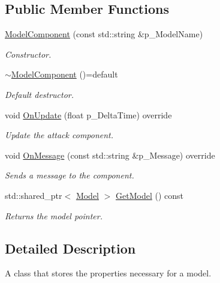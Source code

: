 \subsection*{Public Member Functions}
\begin{DoxyCompactItemize}
\item 
\mbox{\hyperlink{class_model_component_a2697cdcdf32b12a0c0bd69bbec809eb1}{Model\+Component}} (const std\+::string \&p\+\_\+\+Model\+Name)
\begin{DoxyCompactList}\small\item\em Constructor. \end{DoxyCompactList}\item 
\mbox{\label{class_model_component_ac4d9b601719e4740091737731b6bd4fc}} 
\mbox{\hyperlink{class_model_component_ac4d9b601719e4740091737731b6bd4fc}{$\sim$\+Model\+Component}} ()=default
\begin{DoxyCompactList}\small\item\em Default destructor. \end{DoxyCompactList}\item 
void \mbox{\hyperlink{class_model_component_a52333e35346182468a0bfe0311c900e0}{On\+Update}} (float p\+\_\+\+Delta\+Time) override
\begin{DoxyCompactList}\small\item\em Update the attack component. \end{DoxyCompactList}\item 
void \mbox{\hyperlink{class_model_component_aff7bfde1544e8e608e55680706321fac}{On\+Message}} (const std\+::string \&p\+\_\+\+Message) override
\begin{DoxyCompactList}\small\item\em Sends a message to the component. \end{DoxyCompactList}\item 
\mbox{\label{class_model_component_a0ce4506173a7622d4c19341fbe01edc2}} 
std\+::shared\+\_\+ptr$<$ \mbox{\hyperlink{class_model}{Model}} $>$ \mbox{\hyperlink{class_model_component_a0ce4506173a7622d4c19341fbe01edc2}{Get\+Model}} () const
\begin{DoxyCompactList}\small\item\em Returns the model pointer. \end{DoxyCompactList}\end{DoxyCompactItemize}


\subsection{Detailed Description}
A class that stores the properties necessary for a model. 

